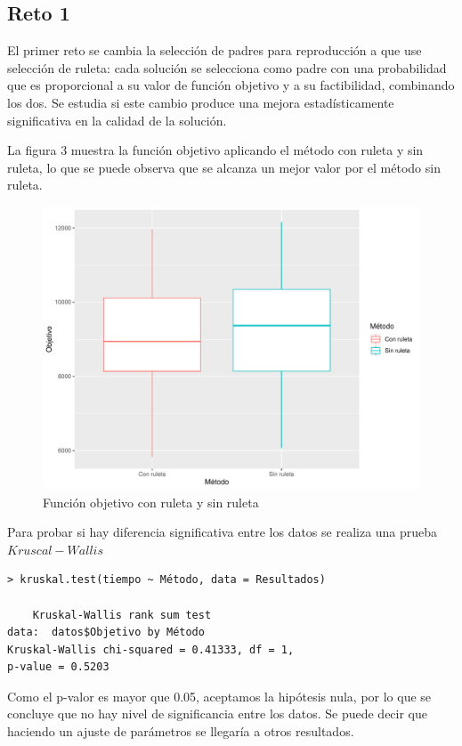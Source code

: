 \documentclass[12pt,letterpaper]{article}
\begin{document}
\begin{itemize}
\section*{Reto 1}
El primer reto se cambia la selección de padres para reproducción a que use selección de ruleta: cada solución se selecciona como padre con una probabilidad que es proporcional a su valor de función objetivo y a su factibilidad, combinando los dos. Se estudia si este cambio produce una mejora estadísticamente significativa en la calidad de la solución. 


La figura 3 muestra la función objetivo aplicando el método con ruleta y sin ruleta, lo que se puede observa que se alcanza un mejor valor por el método sin ruleta. 

\begin{figure}[H]
  \centering
  \includegraphics[scale=.8]{reto}
  \caption{Función objetivo con ruleta y sin ruleta }
\end{figure} 

Para probar si hay diferencia significativa entre los datos se realiza una prueba $Kruscal-Wallis$

\begin{lstlisting}
> kruskal.test(tiempo ~ Método, data = Resultados)

    Kruskal-Wallis rank sum test
data:  datos$Objetivo by Método
Kruskal-Wallis chi-squared = 0.41333, df = 1,
p-value = 0.5203

\end{lstlisting}
Como el p-valor es mayor que 0.05, aceptamos la hipótesis nula, por lo que se concluye que no hay nivel de significancia entre los datos. Se puede decir que haciendo un ajuste de parámetros se llegaría a otros resultados. 


\end{itemize}
\end{document}
